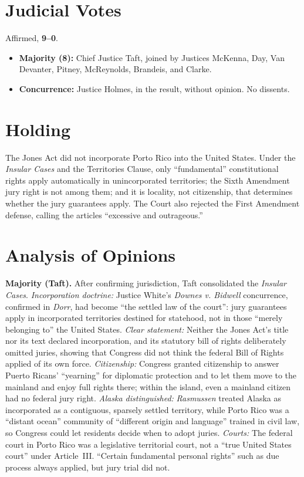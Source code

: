 \documentclass[12pt]{article}
\begin{document}
\section{Judicial Votes}

Affirmed, \textbf{9--0}.
\begin{itemize}
\item \textbf{Majority (8):} Chief Justice Taft, joined by Justices McKenna, Day, Van Devanter, Pitney, McReynolds, Brandeis, and Clarke.
\item \textbf{Concurrence:} Justice Holmes, in the result, without opinion. No dissents.
\end{itemize}

\section{Holding}

The Jones Act did not incorporate Porto Rico into the United States. Under the \textit{Insular Cases} and the Territories Clause, only ``fundamental'' constitutional rights apply automatically in unincorporated territories; the Sixth Amendment jury right is not among them; and it is locality, not citizenship, that determines whether the jury guarantees apply. The Court also rejected the First Amendment defense, calling the articles ``excessive and outrageous.''

\section{Analysis of Opinions}

\textbf{Majority (Taft).} After confirming jurisdiction, Taft consolidated the \textit{Insular Cases}. \emph{Incorporation doctrine:} Justice White's \textit{Downes v. Bidwell} concurrence, confirmed in \textit{Dorr}, had become ``the settled law of the court'': jury guarantees apply in incorporated territories destined for statehood, not in those ``merely belonging to'' the United States. \emph{Clear statement:} Neither the Jones Act's title nor its text declared incorporation, and its statutory bill of rights deliberately omitted juries, showing that Congress did not think the federal Bill of Rights applied of its own force. \emph{Citizenship:} Congress granted citizenship to answer Puerto Ricans' ``yearning'' for diplomatic protection and to let them move to the mainland and enjoy full rights there; within the island, even a mainland citizen had no federal jury right. \emph{Alaska distinguished:} \textit{Rasmussen} treated Alaska as incorporated as a contiguous, sparsely settled territory, while Porto Rico was a ``distant ocean'' community of ``different origin and language'' trained in civil law, so Congress could let residents decide when to adopt juries. \emph{Courts:} The federal court in Porto Rico was a legislative territorial court, not a ``true United States court'' under Article~III. ``Certain fundamental personal rights'' such as due process always applied, but jury trial did not.
\end{document}
